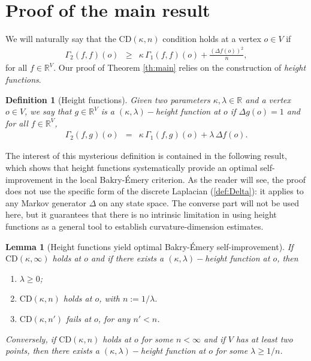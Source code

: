\documentclass[12pt,final]{article}
\newtheorem{lemma}{Lemma}
\newtheorem{definition}{Definition}
\newcommand{\dR}{\mathbb {R}}
\newcommand{\CD}{\mathrm{CD}}
\begin{document}
\section{Proof of the main result}
 We will naturally say that the $\CD(\kappa,n)$ condition holds at a vertex $o\in V$ if 
\begin{eqnarray}
\label{def:locCD}
\Gamma_2(f,f)(o) & \ge &  \kappa\,\Gamma_1(f,f)(o) + \frac{(\Delta f(o))^2}{n},
\end{eqnarray}
for all  $f\in \dR^V$. Our proof of Theorem \ref{th:main} relies on the construction of \emph{height functions}. 
\begin{definition}[Height functions]Given  two parameters $\kappa,\lambda\in\dR$ and a vertex $o\in V$, we say that $g\in\dR^V$ is a $(\kappa,\lambda)-$height function at $o$ if $\Delta g(o)  =  1$ and for all $f\in \dR^V$,
\begin{eqnarray*}
\Gamma_2(f,g)(o) & = & \kappa\,\Gamma_1(f,g)(o) + \lambda\, \Delta f(o).
\end{eqnarray*}
\end{definition}
The interest of this mysterious definition is contained in the following result, which shows that height functions systematically provide an optimal self-improvement in the local Bakry-\'Emery criterion. As the reader will see, the proof does not use the specific form of the discrete Laplacian (\ref{def:Delta}): it applies to any Markov generator $\Delta$ on any state space. The converse part will not be used here, but it guarantees that there is no intrinsic limitation in using height functions as a general tool to establish curvature-dimension estimates. 
\begin{lemma}[Height functions yield optimal Bakry-\'Emery self-improvement]\label{lm:main} If $\CD(\kappa,\infty)$ holds at $o$ and  if there exists a $(\kappa,\lambda)-$height function at $o$, then
\begin{enumerate}
\item  $\lambda\ge 0$; 
\item $\CD(\kappa,n)$ holds at $o$, with $n:=1/\lambda$.
\item $\CD(\kappa,n')$ fails at $o$, for any $n'<n$. 
\end{enumerate}
Conversely, if  $\CD(\kappa,n)$ holds at $o$ for some $n<\infty$ and if $V$ has at least two points, then there exists a $(\kappa,\lambda)-$height function at $o$ for some $\lambda \ge 1/n$.
\end{lemma}
\end{document}
